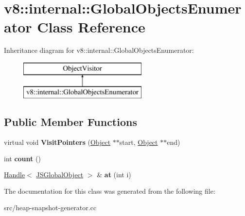 \hypertarget{classv8_1_1internal_1_1_global_objects_enumerator}{}\section{v8\+:\+:internal\+:\+:Global\+Objects\+Enumerator Class Reference}
\label{classv8_1_1internal_1_1_global_objects_enumerator}
Inheritance diagram for v8\+:\+:internal\+:\+:Global\+Objects\+Enumerator\+:\begin{figure}[H]
\begin{center}
\leavevmode
\includegraphics[height=2.000000cm]{classv8_1_1internal_1_1_global_objects_enumerator}
\end{center}
\end{figure}
\subsection*{Public Member Functions}
\begin{DoxyCompactItemize}
\item 
\hypertarget{classv8_1_1internal_1_1_global_objects_enumerator_a9783b5ab354917e3d90390dc8a01f655}{}virtual void {\bfseries Visit\+Pointers} (\hyperlink{classv8_1_1internal_1_1_object}{Object} $\ast$$\ast$start, \hyperlink{classv8_1_1internal_1_1_object}{Object} $\ast$$\ast$end)\label{classv8_1_1internal_1_1_global_objects_enumerator_a9783b5ab354917e3d90390dc8a01f655}

\item 
\hypertarget{classv8_1_1internal_1_1_global_objects_enumerator_a83b8dbd90d400eb5b2d2bd6a53f1b848}{}int {\bfseries count} ()\label{classv8_1_1internal_1_1_global_objects_enumerator_a83b8dbd90d400eb5b2d2bd6a53f1b848}

\item 
\hypertarget{classv8_1_1internal_1_1_global_objects_enumerator_a5f6c11e23a0d9d4abe83af8b9abc2ec1}{}\hyperlink{classv8_1_1internal_1_1_handle}{Handle}$<$ \hyperlink{classv8_1_1internal_1_1_j_s_global_object}{J\+S\+Global\+Object} $>$ \& {\bfseries at} (int i)\label{classv8_1_1internal_1_1_global_objects_enumerator_a5f6c11e23a0d9d4abe83af8b9abc2ec1}

\end{DoxyCompactItemize}


The documentation for this class was generated from the following file\+:\begin{DoxyCompactItemize}
\item 
src/heap-\/snapshot-\/generator.\+cc\end{DoxyCompactItemize}
